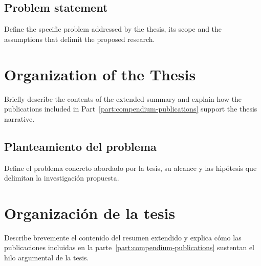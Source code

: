 {
  \subsection{Problem statement}

  Define the specific problem addressed by the thesis, its scope and the assumptions that delimit the proposed research.

  \section{Organization of the Thesis}

  Briefly describe the contents of the extended summary and explain how the publications included in Part~\ref{part:compendium-publications} support the thesis narrative.
}
{
  \subsection{Planteamiento del problema}

  Define el problema concreto abordado por la tesis, su alcance y las hipótesis que delimitan la investigación propuesta.

  \section{Organización de la tesis}

  Describe brevemente el contenido del resumen extendido y explica cómo las publicaciones incluidas en la parte~\ref{part:compendium-publications} sustentan el hilo argumental de la tesis.
}








